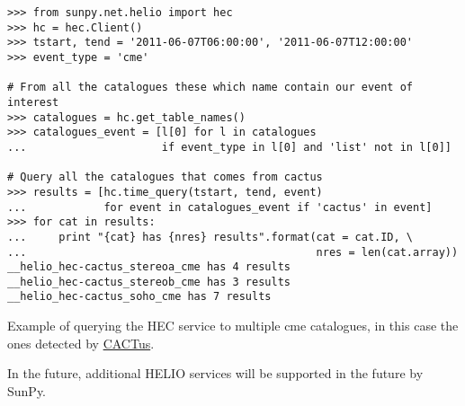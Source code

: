 \begin{listing}[h]
\begin{verbatim}
>>> from sunpy.net.helio import hec
>>> hc = hec.Client()
>>> tstart, tend = '2011-06-07T06:00:00', '2011-06-07T12:00:00'
>>> event_type = 'cme'

# From all the catalogues these which name contain our event of interest
>>> catalogues = hc.get_table_names()
>>> catalogues_event = [l[0] for l in catalogues 
...                     if event_type in l[0] and 'list' not in l[0]]

# Query all the catalogues that comes from cactus
>>> results = [hc.time_query(tstart, tend, event) 
...            for event in catalogues_event if 'cactus' in event]
>>> for cat in results:
...     print "{cat} has {nres} results".format(cat = cat.ID, \
...                                             nres = len(cat.array))
__helio_hec-cactus_stereoa_cme has 4 results
__helio_hec-cactus_stereob_cme has 3 results
__helio_hec-cactus_soho_cme has 7 results
\end{verbatim}
\caption{Example of querying the HEC service to multiple cme
catalogues, in this case the ones detected by \href{http://sidc.oma.be/cactus/}{CACTus}.}
\label{code:helio}
\end{listing}

In the future, additional HELIO services will be supported in the future by SunPy.
